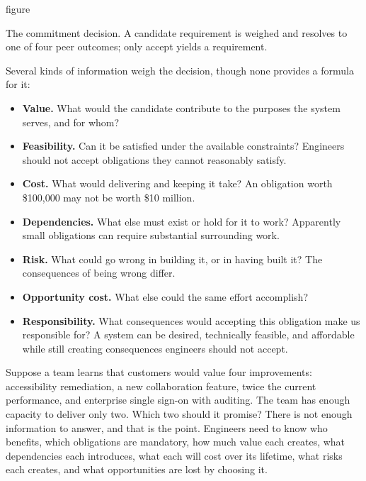 \begin{bookbox}{figure}{} %
\pandocbounded{}

The commitment decision. A candidate requirement is weighed and resolves to one of four peer
outcomes; only accept yields a requirement.
\end{bookbox}

Several kinds of information weigh the decision, though none provides a formula for it:

\begin{itemize}
\tightlist
\item
  \textbf{Value.} What would the candidate contribute to the purposes the system serves, and for whom?
\item
  \textbf{Feasibility.} Can it be satisfied under the available constraints? Engineers should not accept
  obligations they cannot reasonably satisfy.
\item
  \textbf{Cost.} What would delivering and keeping it take? An obligation worth \$100,000 may not be
  worth \$10 million.
\item
  \textbf{Dependencies.} What else must exist or hold for it to work? Apparently small obligations can
  require substantial surrounding work.
\item
  \textbf{Risk.} What could go wrong in building it, or in having built it? The consequences of being
  wrong differ.
\item
  \textbf{Opportunity cost.} What else could the same effort accomplish?
\item
  \textbf{Responsibility.} What consequences would accepting this obligation make us responsible for? A
  system can be desired, technically feasible, and affordable while still creating consequences
  engineers should not accept.
\end{itemize}

Suppose a team learns that customers would value four improvements: accessibility remediation, a new
collaboration feature, twice the current performance, and enterprise single sign-on with auditing.
The team has enough capacity to deliver only two. Which two should it promise? There is not enough
information to answer, and that is the point. Engineers need to know who benefits, which obligations
are mandatory, how much value each creates, what dependencies each introduces, what each will cost
over its lifetime, what risks each creates, and what opportunities are lost by choosing it.

